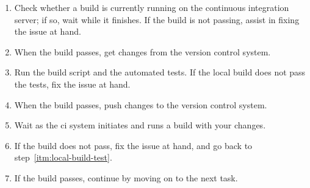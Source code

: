 \documentclass[a4paper,english,12pt]{report}
\begin{document}
\begin{enumerate}
  \item Check whether a build is currently running on the continuous integration server; if so, wait while it finishes. If the build is not passing, assist in fixing the issue at hand.
  \item When the build passes, get changes from the version control system.
  \item\label{itm:local-build-test} Run the build script and the automated tests. If the local build does not pass the tests, fix the issue at hand.
  \item When the build passes, push changes to the version control system.
  \item Wait as the \gls{ci} system initiates and runs a build with your changes.
  \item If the build does not pass, fix the issue at hand, and go back to step~\ref{itm:local-build-test}.
  \item If the build passes, continue by moving on to the next task.
\end{enumerate}
\end{document}
